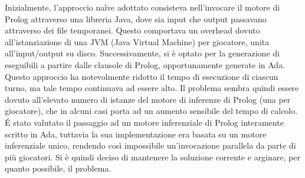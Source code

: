 Inizialmente, l'approccio naîve adottato consisteva nell'invocare il motore di Prolog attraverso una libreria Java, dove sia input che output passavano attraverso dei file temporanei. Questo comportava un overhead dovuto all'istanziazione di una JVM (Java Virtual Machine) per giocatore, unita all'input/output su disco. Successivamente, si è optato per la generazione di eseguibili a partire dalle clausole di Prolog, opportunamente generate in Ada. Questo approccio ha notevolmente ridotto il tempo di esecuzione di ciascun turno, ma tale tempo continuava ad essere alto. Il problema sembra quindi essere dovuto all'elevato numero di istanze del motore di inferenze di Prolog (una per giocatore), che in alcuni casi porta ad un aumento sensibile del tempo di calcolo.\\

É stato valutato il passaggio ad un motore inferenziale di Prolog interamente scritto in Ada, tuttavia la sua implementazione era basata su un motore inferenziale unico, rendendo così impossibile un'invocazione parallela da parte di più giocatori. Si è quindi deciso di mantenere la soluzione corrente e arginare, per quanto possibile, il problema.
